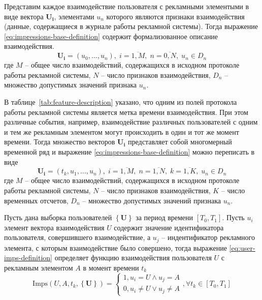 Представим каждое взаимодействие пользователя с рекламными элементыми в виде вектора $\mathbf{U_i}$, элементами $u_n$
которого являются признаки взаимодействия (данные, содержащиеся в журнале работы рекламной системы). Тогда выражение
\eqref{eq:impressions-base-definition} содержит формализованное описание взаимодействия.
\begin{equation}
    \mathbf{U_i} = \left(u_0, \dots, u_n \right),\; i = \overline{1, M},\; n = \overline{0, N},\; u_n \in D_n
    \label{eq:impressions-base-definition}
\end{equation}
где $M$ -- общее число взаимодействий, содержащихся в исходном протоколе работы рекламной системы, $N$ -- число признаков
взаимодействия, $D_n$ -- множество допустимых значений признака $u_n$.

В таблице~\ref{tab:feature-description} указано, что одним из полей протокола работы рекламной системы является метка
времени взаимодействия. При этом различные события, например, взаимодействие различных пользователей с одним и тем же
рекламным элементом могут происходить в один и тот же момент времени. Тогда множество векторов $\mathbf{U_i}$ представляет 
собой многомерный временной ряд и выражение \eqref{eq:impressions-base-definition} можно переписать в виде
\begin{equation}
    \mathbf{U_i} = \left(t_k, u_1, \dots, u_n \right),
    \; i = \overline{1, M},
    \; n = \overline{1, N},
    \; k = \overline{1, K},
    \; u_n \in D_n
\end{equation}
где $M$ -- общее число взаимодействий, содержащихся в исходном протоколе работы рекламной системы, $N$ -- число признаков
взаимодействия, $K$ -- число временных отсчетов, $D_n$ -- множество допустимых значений признака $u_n$.

Пусть дана выборка пользователей $\left\{ \mathbf{U} \right\}$ за период времени $\left[T_0, T_1\right]$. Пусть $u_i$
элемент вектора взаимодействия $U$ содержит значение идентификатора пользователя, совершившего взаимодействие, а $u_j$ -- 
индентификатор рекламного элемента, с которым взаимодействие было совершено, тогда выражение \eqref{eq:user-imps-definition}
определяет функцию взаимодействия пользователя $U$ с рекламным элементом $A$ в момент времени $t_k$
\begin{equation}
    \text{Imps} \left( U, A, t_k, \left\{ \mathbf{U} \right\} \right) =
        \begin{cases}
            1, u_i = U \wedge u_j = A  \\
            0, u_i \neq U \vee u_j \neq A
        \end{cases}, \forall t_k \in \left[T_0, T_1\right]
    \label{eq:user-imps-definition}
\end{equation}

